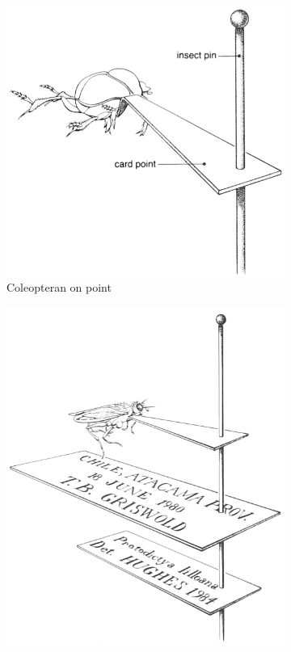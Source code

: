 \documentclass[letterpaper, 11pt]{article}
\begin{document}
\begin{figure}[ht!]
    \centering
    \begin{subfigure}[ht!]{0.43\textwidth}
        \includegraphics[width=\textwidth]{pointedBeetle}
        \caption{Coleopteran on point \citep[][Fig. 18C]{USDAmanual1986}}
        \label{fig:beetlepoint}
    \end{subfigure}
    \qquad
    \begin{subfigure}[ht!]{0.38\textwidth}
        \includegraphics[width=\textwidth]{pointedFly}

\end{subfigure}
\end{figure}
\end{document}
